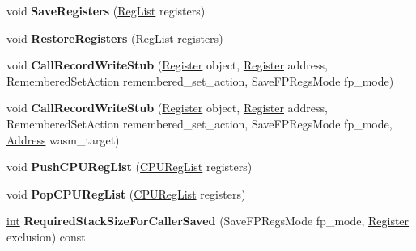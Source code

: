 \begin{DoxyCompactItemize}
\item 
\mbox{\label{classv8_1_1internal_1_1TurboAssembler_adb2676d473b8bdff1c6856758eabfa71}} 
void {\bfseries Save\+Registers} (\mbox{\hyperlink{classuint32__t}{Reg\+List}} registers)
\item 
\mbox{\label{classv8_1_1internal_1_1TurboAssembler_a1ff5e6044d8b7223b66061f3ed4123f1}} 
void {\bfseries Restore\+Registers} (\mbox{\hyperlink{classuint32__t}{Reg\+List}} registers)
\item 
\mbox{\label{classv8_1_1internal_1_1TurboAssembler_ab10280acd4d7aebd053a430cbea68fb1}} 
void {\bfseries Call\+Record\+Write\+Stub} (\mbox{\hyperlink{classv8_1_1internal_1_1Register}{Register}} object, \mbox{\hyperlink{classv8_1_1internal_1_1Register}{Register}} address, Remembered\+Set\+Action remembered\+\_\+set\+\_\+action, Save\+F\+P\+Regs\+Mode fp\+\_\+mode)
\item 
\mbox{\label{classv8_1_1internal_1_1TurboAssembler_a2bc1271b1999cb2ee3784489515931b6}} 
void {\bfseries Call\+Record\+Write\+Stub} (\mbox{\hyperlink{classv8_1_1internal_1_1Register}{Register}} object, \mbox{\hyperlink{classv8_1_1internal_1_1Register}{Register}} address, Remembered\+Set\+Action remembered\+\_\+set\+\_\+action, Save\+F\+P\+Regs\+Mode fp\+\_\+mode, \mbox{\hyperlink{classuintptr__t}{Address}} wasm\+\_\+target)
\item 
\mbox{\label{classv8_1_1internal_1_1TurboAssembler_a6e5569b9488c70c670c590066705b204}} 
void {\bfseries Push\+C\+P\+U\+Reg\+List} (\mbox{\hyperlink{classv8_1_1internal_1_1CPURegList}{C\+P\+U\+Reg\+List}} registers)
\item 
\mbox{\label{classv8_1_1internal_1_1TurboAssembler_a2af0501ead3468160bec2666addf1dd0}} 
void {\bfseries Pop\+C\+P\+U\+Reg\+List} (\mbox{\hyperlink{classv8_1_1internal_1_1CPURegList}{C\+P\+U\+Reg\+List}} registers)
\item 
\mbox{\label{classv8_1_1internal_1_1TurboAssembler_ae78bdbb5bf8eb1f55b7b9fa01890c3da}} 
\mbox{\hyperlink{classint}{int}} {\bfseries Required\+Stack\+Size\+For\+Caller\+Saved} (Save\+F\+P\+Regs\+Mode fp\+\_\+mode, \mbox{\hyperlink{classv8_1_1internal_1_1Register}{Register}} exclusion) const

\end{DoxyCompactItemize}
